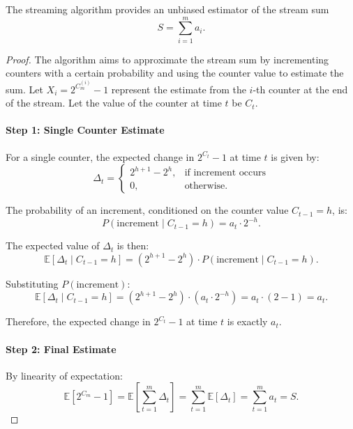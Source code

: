 \documentclass[12pt]{article}
\newenvironment{theorem}[2][Theorem]{\begin{trivlist}
\item[\hskip \labelsep {\bfseries #1}\hskip \labelsep {\bfseries #2.}]}{\end{trivlist}}
\newenvironment{problem}[2][Problem]{\begin{trivlist}
\item[\hskip \labelsep {\bfseries #1}\hskip \labelsep {\bfseries #2.}]}{\end{trivlist}}
\begin{document}
\begin{problem}{1}
    \begin{theorem}{1}
        The streaming algorithm provides an unbiased estimator of the stream sum 
        \[
            S = \sum_{i=1}^m a_i.
        \]
    \end{theorem}
    \begin{proof} 
        The algorithm aims to approximate the stream sum by incrementing counters with a certain probability and using the counter value to estimate the sum. 
        Let \(X_i = 2^{C_m^{(i)}} - 1\) represent the estimate from the \(i\)-th counter at the end of the stream.
        Let the value of the counter at time \(t\) be \(C_t\).
    
        \paragraph{Step 1: Single Counter Estimate}
        For a single counter, the expected change in \(2^{C_t} - 1\) at time \(t\) is given by:
        \[
            \Delta_t = 
            \begin{cases} 
                2^{h+1} - 2^h, & \text{if increment occurs} \\
                0, & \text{otherwise.}
            \end{cases}
        \]
        
        The probability of an increment, conditioned on the counter value \(C_{t-1} = h\), is:
        \[
            P(\text{increment} \mid C_{t-1} = h) = a_t \cdot 2^{-h}.
        \]

        The expected value of \(\Delta_t\) is then:
        \[
            \mathbb{E}[\Delta_t \mid C_{t-1} = h] = (2^{h+1} - 2^h) \cdot P(\text{increment} \mid C_{t-1} = h).
        \]

        Substituting \(P(\text{increment})\):
        \[
            \mathbb{E}[\Delta_t \mid C_{t-1} = h] = (2^{h+1} - 2^h) \cdot (a_t \cdot 2^{-h}) = a_t \cdot (2 - 1) = a_t.
        \]

        Therefore, the expected change in \(2^{C_t} - 1\) at time \(t\) is exactly \(a_t\).
    
        \paragraph{Step 2: Final Estimate}
        By linearity of expectation:
        \[
            \mathbb{E}[2^{C_m} - 1] = \mathbb{E}\left[\sum_{t=1}^m \Delta_t\right] = \sum_{t=1}^m \mathbb{E}[\Delta_t] = \sum_{t=1}^m a_t = S.
        \]
    

\end{proof}
\end{problem}
\end{document}
